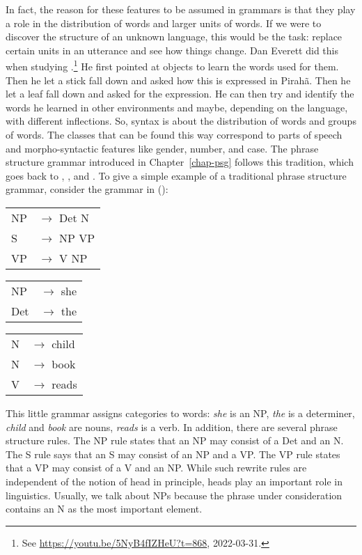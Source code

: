 In fact, the reason for these features to be assumed in grammars is that they play a role
in the distribution of words and larger units of words. If we were to discover the structure of an
unknown language, this would be the task: replace certain units in an utterance and see how things
change. Dan Everett did this when studying .\footnote{
See \url{https://youtu.be/5NyB4fIZHeU?t=868}, 2022-03-31.
} He first pointed at objects to learn the words used for them. Then he let a stick fall down and asked how this is
expressed in Pirahã. Then he let a leaf fall down and asked for the expression. He can then try and
identify the words he learned in other environments and maybe, depending on the language, with different inflections. So, syntax
is about the distribution of words and groups of words. The classes that can be found this way
correspond to parts of speech and morpho-syntactic features like gender, number, and case. The
phrase structure grammar introduced in Chapter~\ref{chap-psg} follows this tradition, which goes back to
\citet{Bloomfield26a}, \citet{Harris46a-u}, and \citet{Wells47a}. To give a simple example of a
traditional phrase structure grammar, consider the grammar in ():
\ea
\label{bsp-grammatik-psg}
\begin{tabular}[t]{@{}l@{ }l}
{NP} & {$\to$ Det N}\\          
{S}  & {$\to$ NP VP}\\
{VP} & {$\to$ V NP}
\end{tabular}\hspace{2cm}%
\begin{tabular}[t]{@{}l@{ }l}
{NP}  & {$\to$ she}\\
{Det} & {$\to$ the}\\
\end{tabular}\hspace{8mm}
\begin{tabular}[t]{@{}l@{ }l}
{N} & {$\to$ child}\\
{N} & {$\to$ book}\\
{V} & {$\to$ reads}\\
\end{tabular}
\z
This little grammar assigns categories to words: \emph{she} is an NP, \emph{the} is a determiner,
\emph{child} and \emph{book} are nouns, \emph{reads} is  a verb. In addition, there are several
phrase structure rules. The NP rule states that an NP may consist of a Det and an N. The S rule says
that an S may consist of an NP and a VP. The VP rule states that a VP may consist of a V and an
NP. While such rewrite rules are independent of the notion of head in principle, heads play an
important role in linguistics. Usually, we talk about NPs because the phrase under consideration
contains an N as the most important element.

